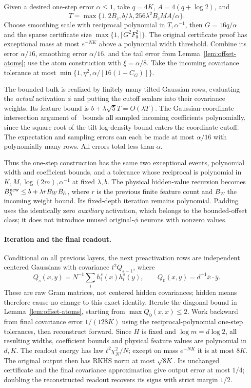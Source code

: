 Given a desired one-step error $\alpha\le1$, take $q=4K$,
$A=4(q+\log2)$, and
\[
 T=\max\{1,2B_c,b/\lambda,256\lambda^2B_cMA/\alpha\}.
\]
Choose smoothing scale with reciprocal polynomial in $T,\alpha^{-1}$,
then $G=16q/\alpha$ and the sparse certificate size
$\max\{1,\lceil G^2F_0^2\rceil\}$. The original certificate proof has
exceptional mass at most $e^{-NK}$ above a polynomial width threshold.
Combine its error $\alpha/16$, smoothing error $\alpha/16$, and the tail
error from Lemma~\ref{lem:offset-atoms}; use the atom construction with
$\xi=\alpha/8$. Take the incoming covariance tolerance at most
$\min\{1,\eta^2,\alpha/[16(1+C_G)]\}$.

The bounded bulk is realized by finitely many tilted Gaussian rows,
evaluating the \emph{actual} activation $\phi$ and putting the cutoff
scalars into their covariance weights. Its feature bound is
$b+\lambda\sqrt5T=O(\lambda T)$. The Gaussian-coordinate intersection
argument of~\cite{lipschitz} bounds all sampled incoming coefficients
polynomially, since the square root of the tilt log-density bound enters
the coordinate cutoff. The expectation and sampling errors can each be
made at most $\alpha/16$ with polynomially many rows. All errors total
less than $\alpha$.

Thus the one-step construction has the same two exceptional events,
polynomial width and coefficient bounds, and a tolerance whose reciprocal
is polynomial in $K,M,\log(2m),\alpha^{-1}$ at fixed $\lambda,b$.
The physical hidden-value recursion becomes
$B_h^{\rm new}\le b+\lambda r B_W B_h$, where $r$ is the previous
finite feature count and $B_W$ the incoming weight bound. Its fixed-depth
iteration remains polynomial. Padding uses the identically zero
\emph{auxiliary} activation, which belongs to the bounded-offset class;
it does not introduce unused original-$\phi$ neurons with nonzero values.

\paragraph{Iteration and the final readout.}
Conditional on all previous layers, the next preactivation rows are
independent centered Gaussians with covariance $t^2Q_{s-1}$, where
\[
 Q_s(x,y)=N^{-1}\sum_i h_i^s(x)h_i^s(y),\qquad
 Q_0(x,y)=d^{-1}\bar x\cdot\bar y.
\]
These are raw Gram matrices, not centered hidden covariances; hidden
means therefore cause no change to this exact identity.
Iterate the diagonal bound in Lemma~\ref{lem:offset-atoms}, starting
from $\max Q_0(x,x)\le2$. Work backward from final covariance error
$1/(128K)$ using the reciprocal-polynomial one-step tolerances, then
reconstruct forward. Since $H$ is fixed and $\log m=d\log2$, all resulting
widths, coefficient bounds and physical feature values are polynomial in
$d,K$. The readout energy has law $t^2\chi_N^2/N$; except on mass
$e^{-NK}$ it is at most $8K$. The original output then has RKHS norm at
most $\sqrt{8K}$. Its unchanged certificate and the final covariance
approximation give output error at most $1/4$; doubling the reconstructed
readout recovers its signs with strict margin $1/2$.

